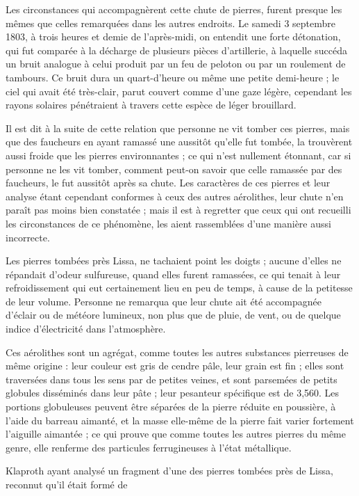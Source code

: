 \documentclass[a4paper, 12pt, oneside, french]{article}
\begin{document}
\og Les circonstances qui accompagnèrent cette chute de pierres, furent presque les mêmes que celles remarquées dans les autres endroits. Le samedi 3 septembre 1803, à trois heures et demie de l'après-midi, on entendit une forte détonation, qui fut comparée à la décharge de plusieurs pièces d'artillerie, à laquelle succéda un bruit analogue à celui produit par un feu de peloton ou par un roulement de tambours. Ce bruit dura un quart-d'heure ou même une petite demi-heure ; le ciel qui avait été très-clair, parut couvert comme d'une gaze légère, cependant les rayons solaires pénétraient à travers cette espèce de léger brouillard. \fg

Il est dit à la suite de cette relation que personne ne vit tomber ces pierres, mais que des faucheurs en ayant ramassé une aussitôt qu'elle fut tombée, la trouvèrent aussi froide que les pierres environnantes ; ce qui n'est nullement étonnant, car si personne ne les vit tomber, comment peut-on savoir que celle ramassée par des faucheurs, le fut aussitôt après sa chute. Les caractères de ces pierres et leur analyse étant cependant conformes à ceux des autres aérolithes, leur chute n'en paraît pas moins bien constatée ; mais il est à regretter que ceux qui ont recueilli les circonstances de ce phénomène, les aient rassemblées d'une manière aussi incorrecte.

Les pierres tombées près Lissa, ne tachaient point les doigts ; aucune d'elles ne répandait d'odeur sulfureuse, quand elles furent ramassées, ce qui tenait à leur refroidissement qui eut certainement lieu en peu de temps, à cause de la petitesse de leur volume. Personne ne remarqua que leur chute ait été accompagnée d'éclair ou de météore lumineux, non plus que de pluie, de vent, ou de quelque indice d'électricité dans l'atmosphère.

Ces aérolithes sont un agrégat, comme toutes les autres substances pierreuses de même origine : leur couleur est gris de cendre pâle, leur grain est fin ; elles sont traversées dans tous les sens par de petites veines, et sont parsemées de petits globules disséminés dans leur pâte ; leur pesanteur spécifique est de 3,560. Les portions globuleuses peuvent être séparées de la pierre réduite en poussière, à l'aide du barreau aimanté, et la masse elle-même de la pierre fait varier fortement l'aiguille aimantée ; ce qui prouve que comme toutes les autres pierres du même genre, elle renferme des particules ferrugineuses à l'état métallique.

Klaproth ayant analysé un fragment d'une des pierres tombées près de Lissa, reconnut qu'il était formé de
\end{document}
